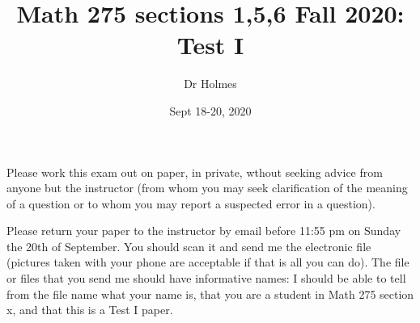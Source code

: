 \documentclass[12pt]{article}
\title{Math 275 sections 1,5,6 Fall 2020:  Test I}
\author{Dr Holmes}
\date{Sept 18-20, 2020}
\begin{document}
\maketitle

Please work this exam out on paper, in private, wthout seeking advice from anyone but the instructor (from whom you may seek clarification of the meaning of a question or to whom you may report  a suspected error in a question).

Please return your paper to the instructor by email before 11:55 pm on Sunday the 20th of September.  You should scan it and send me the electronic file (pictures taken with your phone are acceptable if that is all you can do).  The file or files that you send me should have informative names:  I should be able to tell from the file name what your name is, that you are a student in Math 275 section x, and that this is a Test I paper.

\newpage
\end{document}
